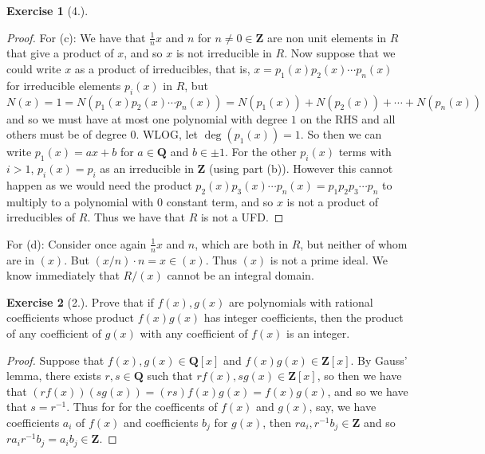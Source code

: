 \documentclass[9pt,reqno]{amsart}
\theoremstyle{definition}
\newtheorem{exercise}{Exercise}[section]
\newcommand{\zz}{\mathbf Z}
\newcommand{\qq}{\mathbf Q}
\begin{document}
\begin{exercise}[4.]
\begin{proof}
		For (c): We have that $\frac{1}{n}x$ and $n$ for $n \neq 0 \in \zz$ 	are non unit elements in $R$ that give a product of $x$, and so $x$ is not irreducible in $R$. Now suppose that we could write $x$ as a product of irreducibles, that is, $x= p_1 (x) p_2 (x) \cdots p_n (x)$ for irreducible elements $p_i (x)$ in $R$, but  $N(x) = 1 = N(p_1(x) p_2 (x) \cdots p_n(x)) = N(p_1(x)) + N(p_2(x)) + \cdots + N(p_n (x))$ and so we must have at most one polynomial with degree $1$ on the RHS and all others must be of degree $0$. WLOG, let $\deg (p_1(x)) = 1$. So then we can write $p_1 (x) = ax+b$ for  $a\in \qq$ and $b \in \pm 1$. For the other $p_i (x)$ terms with $i>1$, $p_i (x) = p_i$ as an irreducible in $\zz$ (using part (b)). However this cannot happen as we would need the product $p_2(x)p_3(x) \cdots  p_n(x) = p_1 p_2 p_3 \cdots p_n$ to multiply to a polynomial with $0$ constant term, and so $x$ is not a product of irreducibles of $R$. Thus we have that $R$ is not a UFD. \end{proof}
		
		For (d): Consider once again $\frac{1}{n} x$ and $n$, which are both in $R$, but neither of whom are in $(x)$. But $(x/n) \cdot n = x \in (x)$. Thus $(x)$ is not a prime ideal. We know immediately that $R/(x)$ cannot be an integral domain. 
\end{exercise}
\begin{exercise}[2.] Prove that if $f(x), g(x)$ are polynomials with rational coefficients whose product $f(x)g(x)$ has integer coefficients, then the product of any coefficient of $g(x)$ with any coefficient of $f(x)$ is an integer.
	
\end{exercise}
\begin{proof}
	Suppose that $f(x), g(x) \in \qq[x]$ and $f(x)g(x) \in \zz[x]$. By Gauss' lemma, there exists $r, s \in \qq$ such that $r f(x), sg(x) \in \zz[x]$, so then we have that $(r f(x))(sg(x)) = (rs)f(x)g(x)  = f(x) g(x)$, and so we have that $s = r^{-1}$. Thus for for the coefficents of $f(x)$ and $g(x)$, say, we have coefficients $a_i$ of $f(x)$ and coefficients $b_j$ for $g(x)$, then $r a_i, r^{-1} b_j \in \zz$ and so $r a_i r^{-1} b_j = a_i b_j \in \zz$. 
\end{proof}
\end{document}
